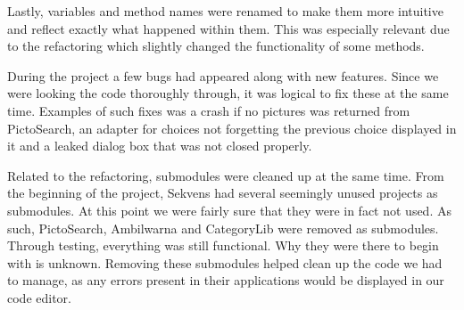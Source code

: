 Lastly, variables and method names were renamed to make them more intuitive and reflect exactly what happened within them. This was especially relevant due to the refactoring which slightly changed the functionality of some methods.

During the project a few bugs had appeared along with new features. Since we were looking the code thoroughly through, it was logical to fix these at the same time. Examples of such fixes was a crash if no pictures was returned from PictoSearch, an adapter for choices not forgetting the previous choice displayed in it and a leaked dialog box that was not closed properly.

Related to the refactoring, submodules were cleaned up at the same time. From the beginning of the project, Sekvens had several seemingly unused projects as submodules. At this point we were fairly sure that they were in fact not used. As such, PictoSearch, Ambilwarna and CategoryLib were removed as submodules. Through testing, everything was still functional. Why they were there to begin with is unknown. Removing these submodules helped clean up the code we had to manage, as any errors present in their applications would be displayed in our code editor.